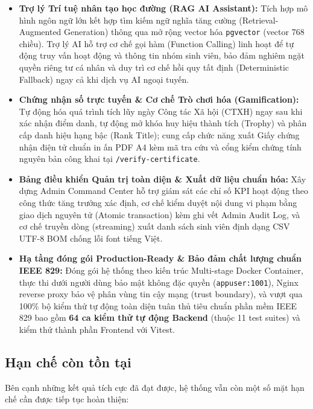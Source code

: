 \begin{itemize}[leftmargin=*]
    \item \textbf{Trợ lý Trí tuệ nhân tạo học đường (RAG AI Assistant):} Tích hợp mô hình ngôn ngữ lớn kết hợp tìm kiếm ngữ nghĩa tăng cường (Retrieval-Augmented Generation) thông qua mở rộng vector hóa \texttt{pgvector} (vector 768 chiều). Trợ lý AI hỗ trợ cơ chế gọi hàm (Function Calling) linh hoạt để tự động truy vấn hoạt động và thông tin nhóm sinh viên, bảo đảm nghiêm ngặt quyền riêng tư cá nhân và duy trì cơ chế hồi quy tất định (Deterministic Fallback) ngay cả khi dịch vụ AI ngoại tuyến.
    
    \item \textbf{Chứng nhận số trực tuyến \& Cơ chế Trò chơi hóa (Gamification):} Tự động hóa quá trình tích lũy ngày Công tác Xã hội (CTXH) ngay sau khi xác nhận điểm danh, tự động mở khóa huy hiệu thành tích (Trophy) và phân cấp danh hiệu hạng bậc (Rank Title); cung cấp chức năng xuất Giấy chứng nhận điện tử chuẩn in ấn PDF A4 kèm mã tra cứu và cổng kiểm chứng tính nguyên bản công khai tại \texttt{/verify-certificate}.
    
    \item \textbf{Bảng điều khiển Quản trị toàn diện \& Xuất dữ liệu chuẩn hóa:} Xây dựng Admin Command Center hỗ trợ giám sát các chỉ số KPI hoạt động theo công thức tăng trưởng xác định, cơ chế kiểm duyệt nội dung vi phạm bằng giao dịch nguyên tử (Atomic transaction) kèm ghi vết Admin Audit Log, và cơ chế truyền dòng (streaming) xuất danh sách sinh viên định dạng CSV UTF-8 BOM chống lỗi font tiếng Việt.
    
    \item \textbf{Hạ tầng đóng gói Production-Ready \& Bảo đảm chất lượng chuẩn IEEE 829:} Đóng gói hệ thống theo kiến trúc Multi-stage Docker Container, thực thi dưới người dùng bảo mật không đặc quyền (\texttt{appuser:1001}), Nginx reverse proxy bảo vệ phân vùng tin cậy mạng (trust boundary), và vượt qua 100\% bộ kiểm thử tự động toàn diện tuân thủ tiêu chuẩn phần mềm IEEE 829\cite{ieee829test} bao gồm \textbf{64 ca kiểm thử tự động Backend} (thuộc 11 test suites) và kiểm thử thành phần Frontend với Vitest.
\end{itemize}

\subsection{Hạn chế còn tồn tại}
Bên cạnh những kết quả tích cực đã đạt được, hệ thống vẫn còn một số mặt hạn chế cần được tiếp tục hoàn thiện:

